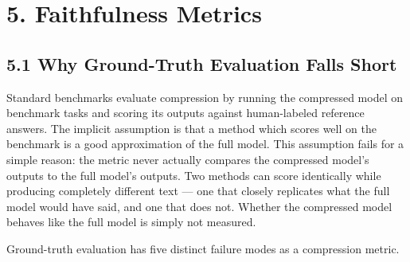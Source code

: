\documentclass[10pt,letterpaper]{article}
\begin{document}
\hypertarget{faithfulness-metrics}{%
\section{5. Faithfulness Metrics}\label{faithfulness-metrics}}

\hypertarget{why-ground-truth-evaluation-falls-short}{%
\subsection{5.1 Why Ground-Truth Evaluation Falls
Short}\label{why-ground-truth-evaluation-falls-short}}

Standard benchmarks evaluate compression by running the compressed model
on benchmark tasks and scoring its outputs against human-labeled
reference answers. The implicit assumption is that a method which scores
well on the benchmark is a good approximation of the full model. This
assumption fails for a simple reason: the metric never actually compares
the compressed model's outputs to the full model's outputs. Two methods
can score identically while producing completely different text --- one
that closely replicates what the full model would have said, and one
that does not. Whether the compressed model behaves like the full model
is simply not measured.

Ground-truth evaluation has five distinct failure modes as a compression
metric.
\end{document}

